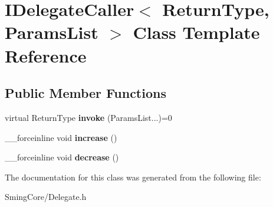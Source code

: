 \hypertarget{class_i_delegate_caller}{}\section{I\+Delegate\+Caller$<$ Return\+Type, Params\+List $>$ Class Template Reference}
\label{class_i_delegate_caller}
\subsection*{Public Member Functions}
\begin{DoxyCompactItemize}
\item 
\hypertarget{class_i_delegate_caller_aeff22075798c3f85fed2d72b62964178}{}virtual Return\+Type {\bfseries invoke} (Params\+List...)=0\label{class_i_delegate_caller_aeff22075798c3f85fed2d72b62964178}

\item 
\hypertarget{class_i_delegate_caller_a3af9e79f473f57e8202c4973d5f37366}{}\+\_\+\+\_\+forceinline void {\bfseries increase} ()\label{class_i_delegate_caller_a3af9e79f473f57e8202c4973d5f37366}

\item 
\hypertarget{class_i_delegate_caller_a4c49d3a30a5224c1910400b9a1cbaf71}{}\+\_\+\+\_\+forceinline void {\bfseries decrease} ()\label{class_i_delegate_caller_a4c49d3a30a5224c1910400b9a1cbaf71}

\end{DoxyCompactItemize}


The documentation for this class was generated from the following file\+:\begin{DoxyCompactItemize}
\item 
Sming\+Core/Delegate.\+h\end{DoxyCompactItemize}

